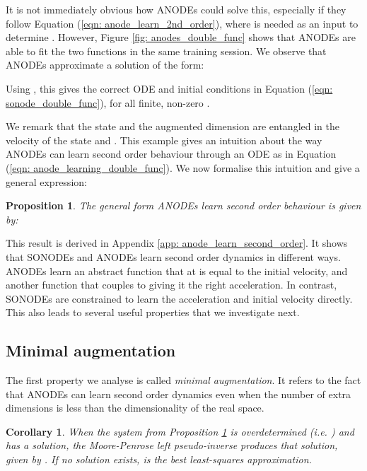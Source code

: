 \documentclass{article}
\newtheorem{corollary}{Corollary}[theorem]
\newtheorem{proposition}[theorem]{Proposition}
\theoremstyle{remark}
\theoremstyle{definition}
\begin{document}
It is not immediately obvious how ANODEs could solve this, especially if they follow Equation (\ref{eqn: anode_learn_2nd_order}), where  is needed as an input to determine . However, Figure \ref{fig: anodes_double_func} shows that ANODEs are able to fit the two functions in the same training session. We observe that ANODEs approximate a solution of the form:

Using , this gives the correct ODE and initial conditions in Equation (\ref{eqn: sonode_double_func}), for all finite, non-zero .

We remark that the state  and the augmented dimension  are entangled in the velocity of the state and . This example gives an intuition about the way ANODEs can learn second order behaviour through an ODE as in Equation (\ref{eqn: anode_learning_double_func}). We now formalise this intuition and give a general expression: \newline

\begin{proposition}
\label{prop: anode_general_form}
The general form ANODEs learn second order behaviour is given by:

\end{proposition}

This result is derived in Appendix \ref{app: anode_learn_second_order}. It shows that SONODEs and ANODEs learn second order dynamics in different ways. ANODEs learn an abstract function  that at  is equal to the initial velocity, and another function  that couples to  giving it the right acceleration. In contrast, SONODEs are constrained to learn the acceleration and initial velocity directly. This also leads to several useful properties that we investigate next. 

\subsection{Minimal augmentation}

The first property we analyse is called \textit{minimal augmentation}. It refers to the fact that ANODEs can learn second order dynamics even when the number of extra dimensions is less than the dimensionality of the real space.

\begin{corollary}
When the system from Proposition \ref{prop: anode_general_form} is overdetermined (i.e. ) and has a solution, the Moore-Penrose left pseudo-inverse produces that solution, given by . If no solution exists,  is the best least-squares approximation.  
\end{corollary}
\end{document}
